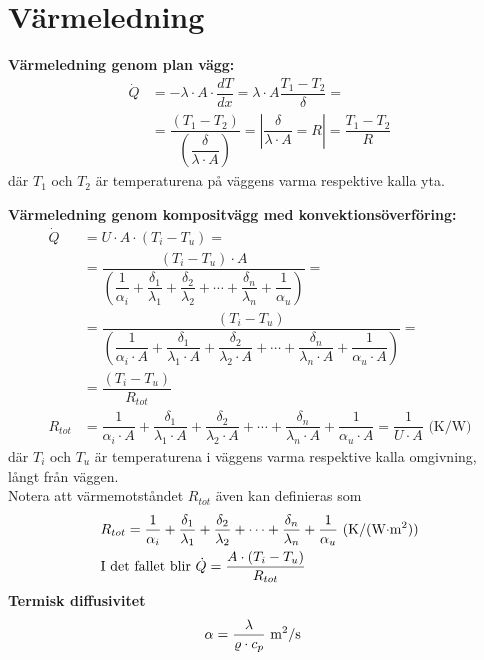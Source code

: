 \section*{Värmeledning}
\textbf{Värmeledning genom plan vägg: }
 \begin{align*}
	\dot{Q} & = - \lambda \cdot A \cdot \dfrac{dT}{dx} = \lambda \cdot A \dfrac{T_1-T_2}{\delta} = \\
		& = \dfrac{(T_1-T_2)}{\left(\dfrac{\delta}{\lambda \cdot A}\right)}  = \left| \dfrac{\delta}{\lambda \cdot A}=R \right| =\dfrac{T_1-T_2}{R}
 \end{align*}
 där $T_1$ och $T_2$ är temperaturena på väggens varma respektive kalla yta. \par
 \textbf{Värmeledning genom kompositvägg med konvektionsöverföring:} 
	\begin{align*}
		\dot{Q} &= U \cdot A \cdot (T_i - T_u) =\\
		& = \dfrac{(T_i-T_u) \cdot A}{\left(\dfrac{1}{\alpha_i}+\dfrac{\delta_1}{\lambda_1}+ \dfrac{\delta_2}{\lambda_2}+\cdots +\dfrac{\delta_n}{\lambda_n}+\dfrac{1}{\alpha_u}\right)} = \\
		 & = \dfrac{(T_i-T_u)}{\left(\dfrac{1}{\alpha_i \cdot A}+\dfrac{\delta_1}{\lambda_1 \cdot A}+ \dfrac{\delta_2}{\lambda_2 \cdot A}+\cdots +\dfrac{\delta_n}{\lambda_n\cdot A} +\dfrac{1}{\alpha_u \cdot A}\right)} = \\
		 & = \dfrac{(T_i-T_u)}{R_{tot}}\\
R_{tot} &= \dfrac{1}{\alpha_i \cdot A}+\dfrac{\delta_1}{\lambda_1 \cdot A}+ \dfrac{\delta_2}{\lambda_2 \cdot A}+\cdots +\dfrac{\delta_n}{\lambda_n\cdot A} +\dfrac{1}{\alpha_u \cdot A} = \dfrac{1}{U \cdot A} \text{ (K/W)}
	\end{align*}
 där $T_i$ och $T_u$ är temperaturena i väggens varma respektive kalla omgivning, långt från väggen. \\
 Notera att värmemotståndet $R_{tot}$ även kan definieras som
	\begin{align*}
	& R_{tot} =  \dfrac{1}{\alpha_i}+\dfrac{\delta_1}{\lambda_1}+ \dfrac{\delta_2}{\lambda_2}+\cdots +\dfrac{\delta_n}{\lambda_n}+\dfrac{1}{\alpha_u} \text{ (K/(W$\cdot$m\textsuperscript{2}))} \\
	& \text{I det fallet blir } \dot{Q} = \dfrac{A \cdot ( T_i - T_u )}{R_{tot}}
	\end{align*}
 \textbf{Termisk diffusivitet}
 \begin{align*}
&\alpha = \dfrac{\lambda}{\varrho \cdot c_p} \text{ m\textsuperscript{2}/s}
 \end{align*}
